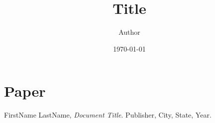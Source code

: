 \documentclass[12pt]{article}
\title{Title}
\author{
        Author \\
}
\date{\today}
\begin{document}
\maketitle

\begin{abstract}
\end{abstract}

\section{Paper} \label{sec:paper}

\begin{thebibliography}{9}

FirstName LastName,
  \emph{Document Title}.
  Publisher,
  City, State,
  Year.

\end{thebibliography}
\end{document}
